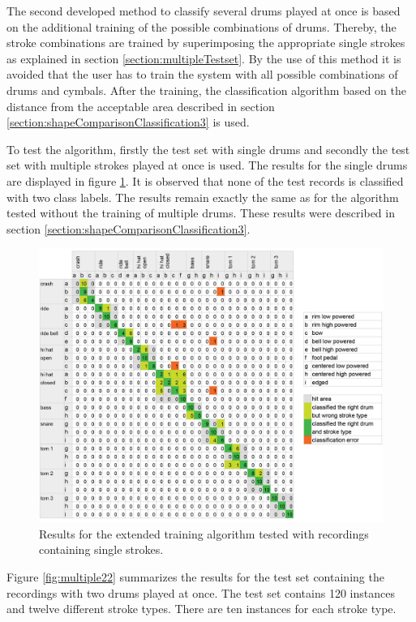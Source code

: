 The second developed method to classify several drums played at once is based on the additional training of the possible combinations of drums. Thereby, the stroke combinations are trained by superimposing the appropriate single strokes as explained in section \ref{section:multipleTestset}. By the use of this method it is avoided that the user has to train the system with all possible combinations of drums and cymbals. After the training, the classification algorithm based on the distance from the acceptable area described in section \ref{section:shapeComparisonClassification3} is used.

To test the algorithm, firstly the test set with single drums and secondly the test set with multiple strokes played at once is used. The results for the single drums are displayed in figure \ref{fig:multiple21}. It is observed that none of the test records is classified with two class labels. The results remain exactly the same as for the algorithm tested without the training of multiple drums. These results were described in section \ref{section:shapeComparisonClassification3}.

\begin{figure}[htbp]
	\centering
	\includegraphics[width=\textwidth]{images/classification_matrix/multiple2_test_single.png}
	\caption{Results for the extended training algorithm tested with recordings containing single strokes.}
	\label{fig:multiple21}
\end{figure}


Figure \ref{fig:multiple22} summarizes the results for the test set containing the recordings with two drums played at once. The test set contains 120 instances and twelve different stroke types. There are ten instances for each stroke type.

